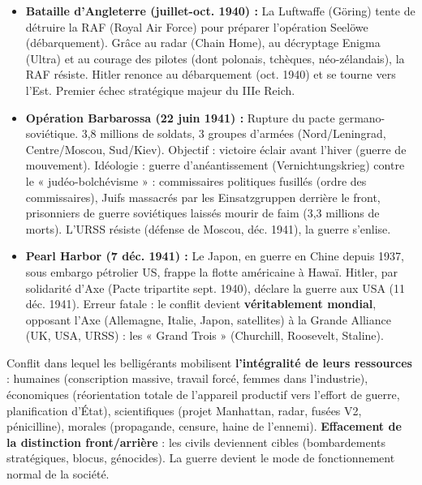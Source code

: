 \documentclass[11pt]{article}
\newcommand{\cle}[1]{{\popxbold\color{popdark}#1}}
\begin{document}
\begin{itemize}
\item \textbf{Bataille d'Angleterre (juillet-oct. 1940) :} La Luftwaffe (Göring) tente de détruire la RAF (Royal Air Force) pour préparer l'opération \cle{Seelöwe} (débarquement). Grâce au radar (\cle{Chain Home}), au décryptage \cle{Enigma} (Ultra) et au courage des pilotes (dont polonais, tchèques, néo-zélandais), la RAF résiste. Hitler renonce au débarquement (oct. 1940) et se tourne vers l'Est. Premier échec stratégique majeur du IIIe Reich.
\item \textbf{Opération \cle{Barbarossa} (22 juin 1941) :} Rupture du pacte germano-soviétique. 3,8 millions de soldats, 3 groupes d'armées (Nord/Leningrad, Centre/Moscou, Sud/Kiev). Objectif : victoire éclair avant l'hiver (guerre de mouvement). Idéologie : \cle{guerre d'anéantissement} (Vernichtungskrieg) contre le « judéo-bolchévisme » : commissaires politiques fusillés (ordre des commissaires), Juifs massacrés par les \cle{Einsatzgruppen} derrière le front, prisonniers de guerre soviétiques laissés mourir de faim (3,3 millions de morts). L'URSS résiste (défense de Moscou, déc. 1941), la guerre s'enlise.
\item \textbf{Pearl Harbor (7 déc. 1941) :} Le Japon, en guerre en Chine depuis 1937, sous embargo pétrolier US, frappe la flotte américaine à Hawaï. Hitler, par solidarité d'Axe (Pacte tripartite sept. 1940), déclare la guerre aux USA (11 déc. 1941). Erreur fatale : le conflit devient \textbf{véritablement mondial}, opposant l'Axe (Allemagne, Italie, Japon, satellites) à la \cle{Grande Alliance} (UK, USA, URSS) : les « \cle{Grand Trois} » (Churchill, Roosevelt, Staline).
\end{itemize}

\begin{definition}
Conflit dans lequel les belligérants mobilisent \textbf{l'intégralité de leurs ressources} : humaines (conscription massive, travail forcé, femmes dans l'industrie), économiques (réorientation totale de l'appareil productif vers l'effort de guerre, planification d'État), scientifiques (projet Manhattan, radar, fusées V2, pénicilline), morales (propagande, censure, haine de l'ennemi). \textbf{Effacement de la distinction front/arrière} : les civils deviennent cibles (bombardements stratégiques, blocus, génocides). La guerre devient le mode de fonctionnement normal de la société.
\end{definition}
\end{document}
